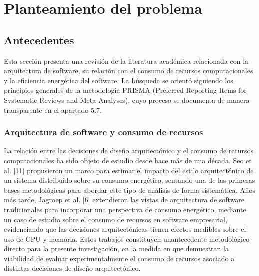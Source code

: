 \chapter{Planteamiento del problema}

\section{Antecedentes}
Esta sección presenta una revisión de la literatura académica relacionada con la arquitectura de software, su relación con el consumo de recursos computacionales y la eficiencia energética del software. La búsqueda se orientó siguiendo los principios generales de la metodología PRISMA (Preferred Reporting Items for Systematic Reviews and Meta-Analyses), cuyo proceso se documenta de manera transparente en el apartado 5.7. 

\subsection{Arquitectura de software y consumo de recursos}
La relación entre las decisiones de diseño arquitectónico y el consumo de recursos computacionales ha sido objeto de estudio desde hace más de una década. Seo et al. [11] propusieron un marco para estimar el impacto del estilo arquitectónico de un sistema distribuido sobre su consumo energético, sentando una de las primeras bases metodológicas para abordar este tipo de análisis de forma sistemática. Años más tarde, Jagroep et al. [6] extendieron las vistas de arquitectura de software tradicionales para incorporar una perspectiva de consumo energético, mediante un caso de estudio sobre el consumo de recursos en software empresarial, evidenciando que las decisiones arquitectónicas tienen efectos medibles sobre el uso de CPU y memoria. Estos trabajos constituyen unantecedente metodológico directo para la presente investigación, en la medida en que demuestran la viabilidad de evaluar experimentalmente el consumo de recursos asociado a distintas decisiones de diseño arquitectónico.

